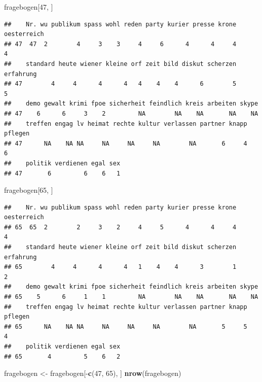 \documentclass[]{article}
\newenvironment{Shaded}{\begin{snugshade}}{\end{snugshade}}
\newcommand{\KeywordTok}[1]{\textcolor[rgb]{0.13,0.29,0.53}{\textbf{{#1}}}}
\newcommand{\DecValTok}[1]{\textcolor[rgb]{0.00,0.00,0.81}{{#1}}}
\newcommand{\StringTok}[1]{\textcolor[rgb]{0.31,0.60,0.02}{{#1}}}
\newcommand{\NormalTok}[1]{{#1}}
\begin{document}
\begin{Shaded}
\begin{Highlighting}[]
\NormalTok{fragebogen[}\DecValTok{47}\NormalTok{, ]}
\end{Highlighting}
\end{Shaded}

\begin{verbatim}
##    Nr. wu publikum spass wohl reden party kurier presse krone oesterreich
## 47  47  2        4     3    3     4     6      4      4     4           4
##    standard heute wiener kleine orf zeit bild diskut scherzen erfahrung
## 47        4     4      4      4   4    4    4      6        5         5
##    demo gewalt krimi fpoe sicherheit feindlich kreis arbeiten skype
## 47    6      6     3    2         NA        NA    NA       NA    NA
##    treffen engag lv heimat rechte kultur verlassen partner knapp pflegen
## 47      NA    NA NA     NA     NA     NA        NA       6     4       6
##    politik verdienen egal sex
## 47       6         6    6   1
\end{verbatim}

\begin{Shaded}
\begin{Highlighting}[]
\NormalTok{fragebogen[}\DecValTok{65}\NormalTok{, ]}
\end{Highlighting}
\end{Shaded}

\begin{verbatim}
##    Nr. wu publikum spass wohl reden party kurier presse krone oesterreich
## 65  65  2        2     3    2     4     5      4      4     4           4
##    standard heute wiener kleine orf zeit bild diskut scherzen erfahrung
## 65        4     4      4      4   1    4    4      3        1         2
##    demo gewalt krimi fpoe sicherheit feindlich kreis arbeiten skype
## 65    5      6     1    1         NA        NA    NA       NA    NA
##    treffen engag lv heimat rechte kultur verlassen partner knapp pflegen
## 65      NA    NA NA     NA     NA     NA        NA       5     5       4
##    politik verdienen egal sex
## 65       4         5    6   2
\end{verbatim}

\begin{Shaded}
\begin{Highlighting}[]
\NormalTok{fragebogen <-}\StringTok{ }\NormalTok{fragebogen[-}\KeywordTok{c}\NormalTok{(}\DecValTok{47}\NormalTok{, }\DecValTok{65}\NormalTok{), ]}
\KeywordTok{nrow}\NormalTok{(fragebogen)}
\end{Highlighting}
\end{Shaded}
\end{document}
